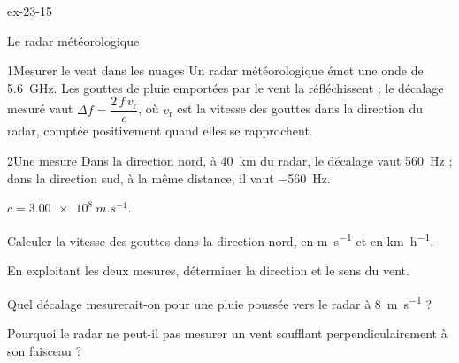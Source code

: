 \begin{blocLivre}{ex-23-15}
\begin{exercice}[3]{Le radar météorologique}
\begin{docu}{1}{Mesurer le vent dans les nuages}
Un radar météorologique émet une onde de \qty{5,6}{GHz}. Les gouttes de pluie emportées par le vent la réfléchissent ; le
décalage mesuré vaut $\Delta f=\dfrac{2\,f\,v_\mathrm{r}}{c}$, où $v_\mathrm{r}$ est la vitesse des gouttes dans la direction du radar,
comptée positivement quand elles se rapprochent.
\end{docu}
\begin{docu}{2}{Une mesure}
Dans la direction nord, à \qty{40}{km} du radar, le décalage vaut \qty{+560}{Hz} ; dans la direction sud, à la même distance, il
vaut \qty{-560}{Hz}.
\end{docu}
\begin{donnees}
$c=\qty{3,00e8}{m.s^{-1}}$.
\end{donnees}
\begin{questions}
\item Calculer la vitesse des gouttes dans la direction nord, en \unit{m.s^{-1}} et en \unit{km.h^{-1}}.
\item \initiative En exploitant les deux mesures, déterminer la direction et le sens du vent.
\item Quel décalage mesurerait-on pour une pluie poussée vers le radar à \qty{8}{m.s^{-1}} ?
\item Pourquoi le radar ne peut-il pas mesurer un vent soufflant perpendiculairement à son faisceau ?
\end{questions}
\end{exercice}
\end{blocLivre}

